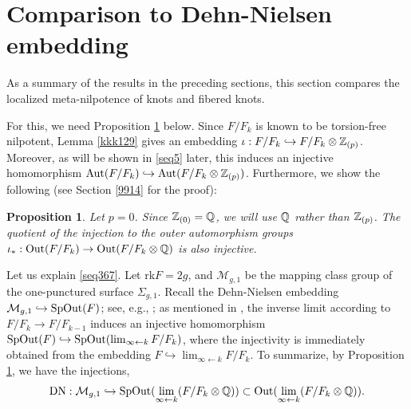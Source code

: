 \documentclass{article}
\theoremstyle{plain}
\newtheorem{prop}[thm]{Proposition}
\theoremstyle{definition}
\newcommand{\ra}{\rightarrow}
\newcommand{\Q}{{\Bbb Q}}
\newcommand{\Z}{{\Bbb Z}}
\newcommand{\Aut}{{\rm Aut}}
\newcommand{\Out}{{\rm Out}}
\newcommand{\SpOut}{{\rm SpOut}}
\begin{document}
{\section{Comparison to Dehn-Nielsen embedding}
\label{93553}
As a summary of the results in the preceding sections, this section compares the localized meta-nilpotence of knots and fibered knots.


For this, we need Proposition \ref{jj2} below. Since $F/F_k$ is known to be torsion-free nilpotent, Lemma \ref{kkk129} gives an embedding $\iota : F/F_{k} \hookrightarrow F/F_{k}\otimes \Z_{(p)} $. Moreover, as will be shown in \eqref{seq5} later, this induces an injective homomorphism $ \Aut(F/F_{k} ) \hookrightarrow \Aut(F/F_{k} \otimes \Z_{(p)})$. Furthermore, we show the following (see Section \ref{9914} for the proof):
\begin{prop}\label{jj2} Let $p=0$. Since $\Z_{(0)} = \Q$, we will use $\Q$ rather than $\Z_{(p)}$. The quotient of the injection to the outer automorphism groups $\iota_*: \Out(F/F_{k} ) \rightarrow \Out(F/F_{k} \otimes \Q) $ is also injective.
\end{prop}
\noindent
Let us explain \eqref{seq367}. Let rk$F=2g $, and $\mathcal{M}_{g,1}$ be the mapping class group of the one-punctured surface $\Sigma_{g,1} $. Recall the Dehn-Nielsen embedding $ \mathcal{M}_{g,1} \hookrightarrow \SpOut(F) $; see, e.g., \cite[Theorem 8.8]{FM}; as mentioned in \cite[Page 446]{Mo2}, the inverse limit according to $F/F_k \ra F/F_{k-1}$ induces an injective homomorphism $\SpOut(F) \hookrightarrow \SpOut( \lim_{\infty \leftarrow k }  F/F_k )$, where the injectivity is immediately obtained from the embedding $F \hookrightarrow \lim_{\infty \leftarrow k }  F/F_k $. To summarize, by Proposition \ref{jj2}, we have the injections,
\begin{equation}\label{seq367}
\mathrm{DN}: \mathcal{M}_{g,1} \hookrightarrow \mathrm{SpOut}(\lim_{\infty \leftarrow k } (F/ F_k \otimes \Q )) \subset \mathrm{Out}(\lim_{\infty \leftarrow k } (F/ F_k \otimes \Q )).
\end{equation}

}
\end{document}
